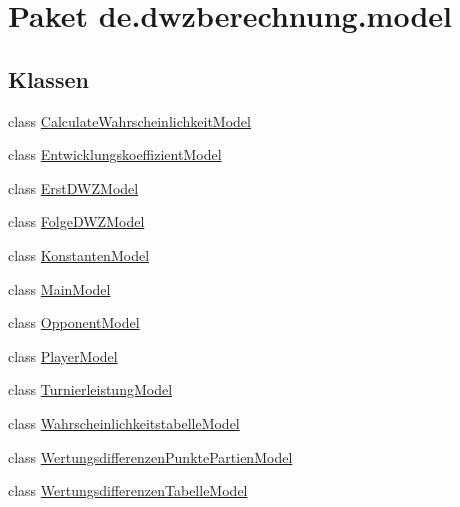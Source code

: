 \hypertarget{namespacede_1_1dwzberechnung_1_1model}{}\section{Paket de.\+dwzberechnung.\+model}
\label{namespacede_1_1dwzberechnung_1_1model}
\subsection*{Klassen}
\begin{DoxyCompactItemize}
\item 
class \hyperlink{classde_1_1dwzberechnung_1_1model_1_1_calculate_wahrscheinlichkeit_model}{Calculate\+Wahrscheinlichkeit\+Model}
\item 
class \hyperlink{classde_1_1dwzberechnung_1_1model_1_1_entwicklungskoeffizient_model}{Entwicklungskoeffizient\+Model}
\item 
class \hyperlink{classde_1_1dwzberechnung_1_1model_1_1_erst_d_w_z_model}{Erst\+D\+W\+Z\+Model}
\item 
class \hyperlink{classde_1_1dwzberechnung_1_1model_1_1_folge_d_w_z_model}{Folge\+D\+W\+Z\+Model}
\item 
class \hyperlink{classde_1_1dwzberechnung_1_1model_1_1_konstanten_model}{Konstanten\+Model}
\item 
class \hyperlink{classde_1_1dwzberechnung_1_1model_1_1_main_model}{Main\+Model}
\item 
class \hyperlink{classde_1_1dwzberechnung_1_1model_1_1_opponent_model}{Opponent\+Model}
\item 
class \hyperlink{classde_1_1dwzberechnung_1_1model_1_1_player_model}{Player\+Model}
\item 
class \hyperlink{classde_1_1dwzberechnung_1_1model_1_1_turnierleistung_model}{Turnierleistung\+Model}
\item 
class \hyperlink{classde_1_1dwzberechnung_1_1model_1_1_wahrscheinlichkeitstabelle_model}{Wahrscheinlichkeitstabelle\+Model}
\item 
class \hyperlink{classde_1_1dwzberechnung_1_1model_1_1_wertungsdifferenzen_punkte_partien_model}{Wertungsdifferenzen\+Punkte\+Partien\+Model}
\item 
class \hyperlink{classde_1_1dwzberechnung_1_1model_1_1_wertungsdifferenzen_tabelle_model}{Wertungsdifferenzen\+Tabelle\+Model}
\end{DoxyCompactItemize}
